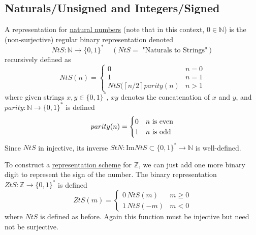\subsection{Naturals/Unsigned and Integers/Signed}

  \begin{definition}
    \label{def:representation-of-the-naturals}
    A representation for \hyperref[st-def:naturals]{natural numbers} (note that in this context, $0 \in \mathbb{N}$) is the (non-surjective) regular binary representation denoted
    \begin{equation}
      NtS: \mathbb{N} \to \{0,1\}^\ast \;\;\;\; (NtS= \text{ "Naturals to Strings"})
    \end{equation}
    recursively defined as 
    \begin{equation}
      NtS(n) = \begin{cases}
          0 & n = 0 \\
          1 & n = 1 \\
          NtS(\left \lceil{n/2}\right \rceil parity(n) & n > 1
          \end{cases}
    \end{equation}
    where given strings $x, y \in \{0,1\}^\ast$, $xy$ denotes the concatenation of $x$ and $y$, and $parity: \mathbb{N} \to \{0,1\}^\ast$ is defined 
    \begin{equation}
      parity(n) = \begin{cases}
          0 & n $\text{ is even}$ \\
          1 & n $\text{ is odd}$
          \end{cases}
    \end{equation}
    Since $NtS$ in injective, its inverse $StN: \mathrm{Im}{NtS} \subset \{0,1\}^\ast \to \mathbb{N}$ is well-defined. 
  \end{definition}

  \begin{definition}
    \label{def:representation-of-the-integers}
    To construct a \hyperref[def:representation-scheme]{representation scheme} for $\mathbb{Z}$, we can just add one more binary digit to represent the sign of the number. The binary representation $ZtS: \mathbb{Z} \to \{0, 1\}^\ast$ is defined
    \begin{equation}
      ZtS(m) = \begin{cases}
          0\, NtS(m) & m \geq 0 \\
          1 \, NtS(-m) & m < 0
          \end{cases}
    \end{equation}
    where $NtS$ is defined as before. Again this function must be injective but need not be surjective. 
  \end{definition}


